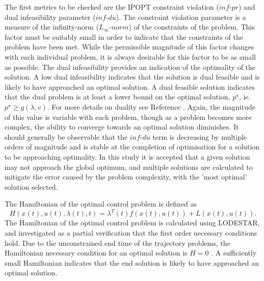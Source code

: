 The first metrics to be checked are the IPOPT constraint violation ($inf\textrm{-}pr$) and dual infeasibility parameter ($inf\textrm{-}du$)\cite{Kawajir2010}. The constraint violation parameter is a measure of the infinity-norm ($L_\infty\textrm{-}norm$) of the constraints of the problem\cite{Kawajir2010}. This factor must be suitably small in order to indicate that the constraints of the problem have been met. While the permissible magnitude of this factor changes with each individual problem, it is always desirable for this factor to be as small as possible. The dual infeasibility provides an indication of the optimality of the solution. A low dual infeasibility indicates that the solution is dual feasible and is likely to have approached an optimal solution. A dual feasible solution indicates that the dual problem is at least a lower bound on the optimal solution, $p^\star$, ie. $p^\star \geq g(\lambda,v)$. For more details on duality see Reference \cite{Hindi2006}.
 Again, the magnitude of this value is variable with each problem, though as a problem becomes more complex, the ability to converge towards an optimal solution diminishes. It should generally be observable that the $inf\textrm{-}du$ term is decreasing by multiple orders of magnitude and is stable at the completion of optimisation for a solution to be approaching optimality. In this study it is accepted that a given solution may not approach the global optimum, and multiple solutions are calculated to mitigate the error caused by the problem complexity, with the 'most optimal' solution selected. 


The Hamiltonian of the optimal control problem is defined as 
\begin{equation}
H(x(t),u(t),\lambda(t),t) = \lambda^T(t)f(x(t),u(t)) + L(x(t),u(t)).
\end{equation}
The Hamiltonian of the optimal control problem is calculated using LODESTAR, and investigated as a partial verification that the first order necessary conditions hold. Due to the unconstrained end time of the trajectory problems, the Hamiltonian necessary condition for an optimal solution is $H = 0 $ \cite{Pucci2007}. 
 A sufficiently small Hamiltonian indicates that the end solution is likely to have approached an optimal solution.



